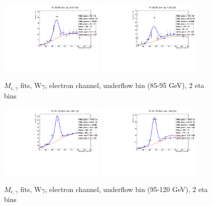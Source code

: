 \begin{figure}[htb]
  \begin{center}
   \includegraphics[width=0.45\textwidth]{../figs/figs_v11/ELECTRON_WGamma/EtoGammaFits/sa_hZmass_h_Data_EtoGamma_Enr_BARREL_pt85to95_ieta0_noWMtCut.pdf}
   \includegraphics[width=0.45\textwidth]{../figs/figs_v11/ELECTRON_WGamma/EtoGammaFits/sa_hZmass_h_Data_EtoGamma_Enr_ENDCAP_pt85to95_ieta0_noWMtCut.pdf}\\
  \label{fig:etogFits_85to95}
  \caption{$M_{e,\gamma}$ fits, W$\gamma$, electron channel, underflow bin (85-95 GeV), 2 eta bins}
  \end{center}
\end{figure}

\begin{figure}[htb]
  \begin{center}
   \includegraphics[width=0.45\textwidth]{../figs/figs_v11/ELECTRON_WGamma/EtoGammaFits/sa_hZmass_h_Data_EtoGamma_Enr_BARREL_pt95to120_ieta0_noWMtCut.pdf}
   \includegraphics[width=0.45\textwidth]{../figs/figs_v11/ELECTRON_WGamma/EtoGammaFits/sa_hZmass_h_Data_EtoGamma_Enr_ENDCAP_pt95to120_ieta0_noWMtCut.pdf}\\
  \label{fig:etogFits_95to120}
  \caption{$M_{e,\gamma}$ fits, W$\gamma$, electron channel, underflow bin (95-120 GeV), 2 eta bins}
  \end{center}
\end{figure}

